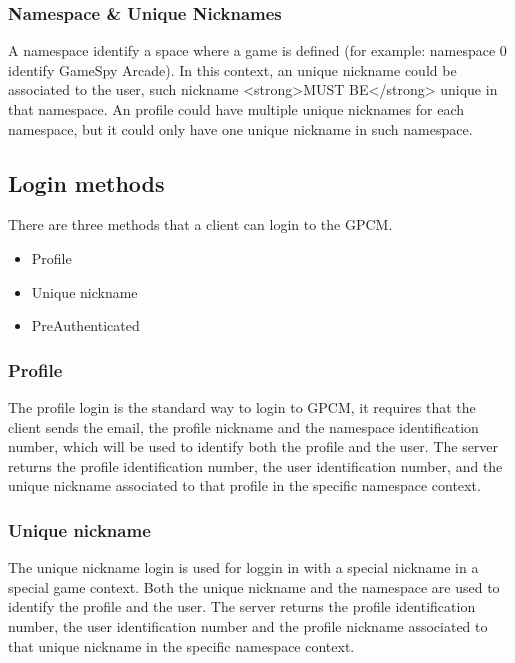\documentclass[oneside,titlepage,a4paper]{Definition/retrospy} %
\begin{document}
		\subsubsection{Namespace \& Unique Nicknames}
	            A namespace identify a space where a game is defined (for example: namespace 0 identify GameSpy Arcade).
	            In this context, an unique nickname could be associated to the user, such nickname <strong>MUST BE</strong> unique in that namespace.
	            An profile could have multiple unique nicknames for each namespace, but it could only have one unique nickname in such namespace.

		\subsection{Login methods}
		There are three methods that a client can login to the GPCM.
		\begin{itemize}
			\item Profile
			\item Unique nickname
			\item PreAuthenticated
		\end{itemize}

		\subsubsection{Profile}
			The profile login is the standard way to login to GPCM, it requires that the client sends the email, the profile nickname and the namespace identification number, which will be used to identify both the profile and the user.
			The server returns the profile identification number, the user identification number, and the unique nickname associated to that profile in the specific namespace context.
		\subsubsection{Unique nickname}
			The unique nickname login is used for loggin in with a special nickname in a special game context. Both the unique nickname and the namespace are used to identify the profile and the user.
			The server returns the profile identification number, the user identification number and the profile nickname associated to that unique nickname in the specific namespace context.
\end{document}
